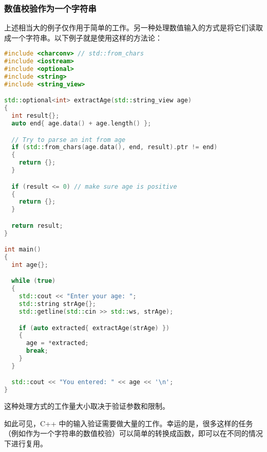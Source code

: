\documentclass[../../LearnCpp.tex]{subfiles}
\begin{document}
\subsubsection*{数值校验作为一个字符串}

上述相当大的例子仅作用于简单的工作。另一种处理数值输入的方式是将它们读取成一个字符串。以下例子就是使用这样的方法论：

\begin{lstlisting}[language=C++]
#include <charconv> // std::from_chars
#include <iostream>
#include <optional>
#include <string>
#include <string_view>

std::optional<int> extractAge(std::string_view age)
{
  int result{};
  auto end{ age.data() + age.length() };

  // Try to parse an int from age
  if (std::from_chars(age.data(), end, result).ptr != end)
  {
    return {};
  }

  if (result <= 0) // make sure age is positive
  {
    return {};
  }

  return result;
}

int main()
{
  int age{};

  while (true)
  {
    std::cout << "Enter your age: ";
    std::string strAge{};
    std::getline(std::cin >> std::ws, strAge);

    if (auto extracted{ extractAge(strAge) })
    {
      age = *extracted;
      break;
    }
  }

  std::cout << "You entered: " << age << '\n';
}
\end{lstlisting}

这种处理方式的工作量大小取决于验证参数和限制。

如此可见，C++ 中的输入验证需要做大量的工作。幸运的是，很多这样的任务（例如作为一个字符串的数值校验）可以简单的转换成函数，即可以在不同的情况下进行复用。
\end{document}
